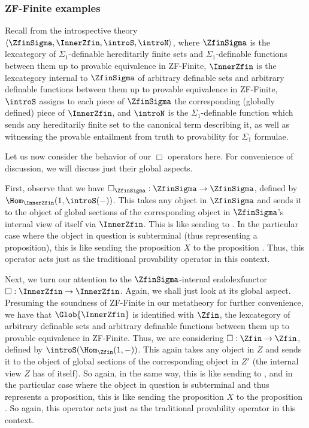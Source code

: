 \subsubsection{ZF-Finite examples}\label{ZFFiniteModal}
Recall from  the introspective theory $\langle \ZfinSigma, \InnerZfin, \introS, \introN \rangle$, where $\ZfinSigma$ is the lexcategory of $\Sigma_1$-definable hereditarily finite sets and $\Sigma_1$-definable functions between them up to provable equivalence in ZF-Finite, $\InnerZfin$ is the lexcategory internal to $\ZfinSigma$ of arbitrary definable sets and arbitrary definable functions between them up to provable equivalence in ZF-Finite, $\introS$ assigns to each piece of $\ZfinSigma$ the corresponding (globally defined) piece of $\InnerZfin$, and $\introN$ is the $\Sigma_1$-definable function which sends any hereditarily finite set to the canonical term describing it, as well as witnessing the provable entailment from truth to provability for $\Sigma_1$ formulae.

Let us now consider the behavior of our $\Box$ operators here. For convenience of discussion, we will discuss just their global aspects.

First, observe that we have $\Box_{\ZfinSigma} : \ZfinSigma \to \ZfinSigma$, defined by $\Hom_{\InnerZfin}(1, \introS(-))$. This takes any object in $\ZfinSigma$ and sends it to the object of global sections of the corresponding object in $\ZfinSigma$'s internal view of itself via $\InnerZfin$. This is like sending  to . In the particular case where the object in question is subterminal (thus representing a proposition), this is like sending the proposition $X$ to the proposition . Thus, this operator acts just as the traditional provability operator in this context.

Next, we turn our attention to the $\ZfinSigma$-internal endolexfunctor $\Box : \InnerZfin \to \InnerZfin$. Again, we shall just look at its global aspect. Presuming the soundness of ZF-Finite in our metatheory for further convenience, we have that $\Glob{\InnerZfin}$ is identified with $\Zfin$, the lexcategory of arbitrary definable sets and arbitrary definable functions between them up to provable equivalence in ZF-Finite. Thus, we are considering $\Box : \Zfin \to \Zfin$, defined by $\introS(\Hom_{\Zfin}(1, -))$. This again takes any object in $Z$ and sends it to the object of global sections of the corresponding object in $Z'$ (the internal view $Z$ has of itself). So again, in the same way, this is like sending  to , and in the particular case where the object in question is subterminal and thus represents a proposition, this is like sending the proposition $X$ to the proposition . So again, this operator acts just as the traditional provability operator in this context.

